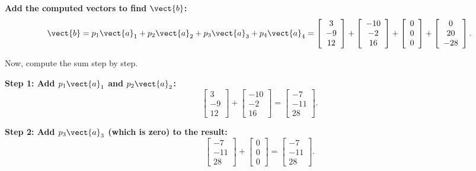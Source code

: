 \begin{solution}
    \textbf{Add the computed vectors to find $\vect{b}$:}
    \[
    \vect{b} = p_1 \vect{a}_1 + p_2 \vect{a}_2 + p_3 \vect{a}_3 + p_4 \vect{a}_4 = \left[\begin{array}{c}
    3 \\
    -9 \\
    12
    \end{array}\right] + \left[\begin{array}{c}
    -10 \\
    -2 \\
    16
    \end{array}\right] + \left[\begin{array}{c}
    0 \\
    0 \\
    0
    \end{array}\right] + \left[\begin{array}{c}
    0 \\
    20 \\
    -28
    \end{array}\right].
    \]
    
    Now, compute the sum step by step.
    
    \textbf{Step 1: Add $p_1 \vect{a}_1$ and $p_2 \vect{a}_2$:}
    \[
    \left[\begin{array}{c}
    3 \\
    -9 \\
    12
    \end{array}\right] + \left[\begin{array}{c}
    -10 \\
    -2 \\
    16
    \end{array}\right] = \left[\begin{array}{c}
    -7 \\
    -11 \\
    28
    \end{array}\right].
    \]
    
    \textbf{Step 2: Add $p_3 \vect{a}_3$ (which is zero) to the result:}
    \[
    \left[\begin{array}{c}
    -7 \\
    -11 \\
    28
    \end{array}\right] + \left[\begin{array}{c}
    0 \\
    0 \\
    0
    \end{array}\right] = \left[\begin{array}{c}
    -7 \\
    -11 \\
    28
    \end{array}\right].
    \]
    

\end{solution}
